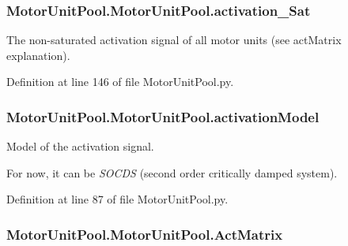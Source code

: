 \subsubsection[{\texorpdfstring{activation\+\_\+\+Sat}{activation_Sat}}]{\setlength{\rightskip}{0pt plus 5cm}Motor\+Unit\+Pool.\+Motor\+Unit\+Pool.\+activation\+\_\+\+Sat}\hypertarget{class_motor_unit_pool_1_1_motor_unit_pool_ac475d1369c38d0bc5064c7243b4e1d44}{}\label{class_motor_unit_pool_1_1_motor_unit_pool_ac475d1369c38d0bc5064c7243b4e1d44}


The non-\/saturated activation signal of all motor units (see act\+Matrix explanation). 



Definition at line 146 of file Motor\+Unit\+Pool.\+py.

\subsubsection[{\texorpdfstring{activation\+Model}{activationModel}}]{\setlength{\rightskip}{0pt plus 5cm}Motor\+Unit\+Pool.\+Motor\+Unit\+Pool.\+activation\+Model}\hypertarget{class_motor_unit_pool_1_1_motor_unit_pool_abaa7680d0691fac81f66b200dfcfd203}{}\label{class_motor_unit_pool_1_1_motor_unit_pool_abaa7680d0691fac81f66b200dfcfd203}


Model of the activation signal. 

For now, it can be {\itshape S\+O\+C\+DS} (second order critically damped system). 

Definition at line 87 of file Motor\+Unit\+Pool.\+py.

\subsubsection[{\texorpdfstring{Act\+Matrix}{ActMatrix}}]{\setlength{\rightskip}{0pt plus 5cm}Motor\+Unit\+Pool.\+Motor\+Unit\+Pool.\+Act\+Matrix}\hypertarget{class_motor_unit_pool_1_1_motor_unit_pool_ad03b9e215e833188060e90bc4392d42b}{}\label{class_motor_unit_pool_1_1_motor_unit_pool_ad03b9e215e833188060e90bc4392d42b}


